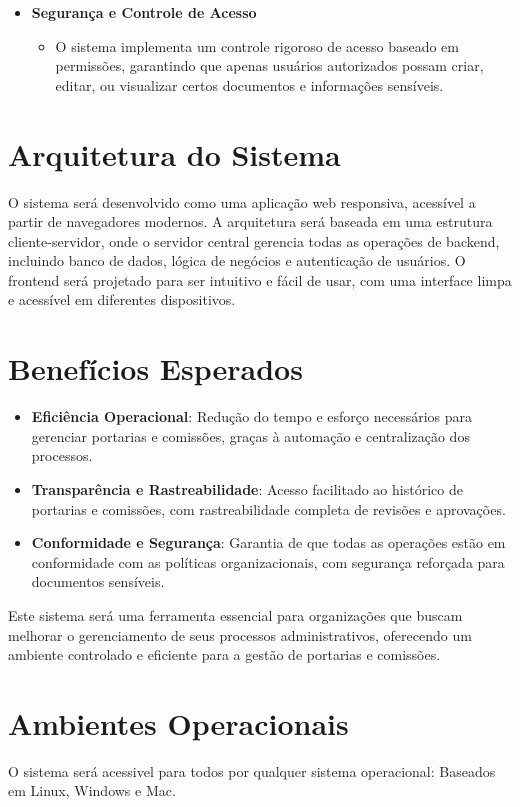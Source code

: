\documentclass{scrreprt}
\begin{document}
\begin{itemize}
    \item \textbf{Segurança e Controle de Acesso}
    \begin{itemize}
        \item O sistema implementa um controle rigoroso de acesso baseado em permissões, garantindo que apenas usuários autorizados possam criar, editar, ou visualizar certos documentos e informações sensíveis.
    \end{itemize}
\end{itemize}

\section{Arquitetura do Sistema}

O sistema será desenvolvido como uma aplicação web responsiva, acessível a partir de navegadores modernos. A arquitetura será baseada em uma estrutura cliente-servidor, onde o servidor central gerencia todas as operações de backend, incluindo banco de dados, lógica de negócios e autenticação de usuários. O frontend será projetado para ser intuitivo e fácil de usar, com uma interface limpa e acessível em diferentes dispositivos.

\section{Benefícios Esperados}

\begin{itemize}
    \item \textbf{Eficiência Operacional}: Redução do tempo e esforço necessários para gerenciar portarias e comissões, graças à automação e centralização dos processos.
    \item \textbf{Transparência e Rastreabilidade}: Acesso facilitado ao histórico de portarias e comissões, com rastreabilidade completa de revisões e aprovações.
    \item \textbf{Conformidade e Segurança}: Garantia de que todas as operações estão em conformidade com as políticas organizacionais, com segurança reforçada para documentos sensíveis.
\end{itemize}

Este sistema será uma ferramenta essencial para organizações que buscam melhorar o gerenciamento de seus processos administrativos, oferecendo um ambiente controlado e eficiente para a gestão de portarias e comissões.

\section{Ambientes Operacionais}
O sistema será acessivel para todos por qualquer sistema operacional: Baseados em Linux, Windows e Mac.
\end{document}

